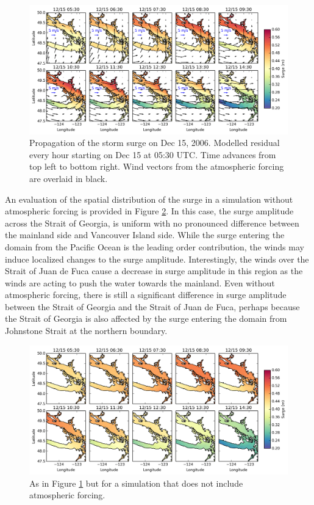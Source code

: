 \documentclass[pdftex,10pt]{article}
\begin{document}
\begin{figure}
\centering
\includegraphics[scale=0.6]{Figures/dec2006_spatial.pdf}
\caption{Propagation of the storm surge on Dec 15, 2006. Modelled residual every hour starting on Dec 15 at 05:30 UTC. Time advances from top left to bottom right. Wind vectors from the atmospheric forcing are overlaid in black.}
\label{fig:spatial}
\end{figure}

An evaluation of the spatial distribution of the surge in a simulation without atmospheric forcing is provided in Figure \ref{fig:spatial_sshonly}. In this case, the surge amplitude across the Strait of Georgia, is uniform with no pronounced difference between the mainland side and Vancouver Island side. While the surge entering the domain from the Pacific Ocean is the leading order contribution, the winds may induce localized changes to the surge amplitude. Interestingly, the winds over the Strait of Juan de Fuca cause a decrease in surge amplitude in this region as the winds are acting to push the water towards the mainland.  Even without atmospheric forcing, there is still a significant difference in surge amplitude between the Strait of Georgia and the Strait of Juan de Fuca, perhaps because the Strait of Georgia is also affected by the surge entering the domain from Johnstone Strait at the northern boundary.

\begin{figure}
\centering
\includegraphics[scale=0.6]{Figures/dec2006_spatial_sshonly.pdf}
\caption{As in Figure \ref{fig:spatial} but for a simulation that does not include atmospheric forcing. }
\label{fig:spatial_sshonly}
\end{figure}
\end{document}
